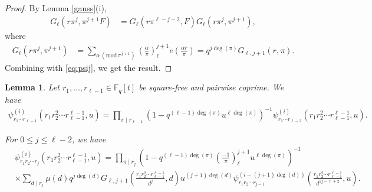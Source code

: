 \documentclass[12pt]{amsart}
\newtheorem{lemma}[theorem]{Lemma}
\newcommand{\F}{\mathbb{F}}
\renewcommand{\pmod}[1]{\,(\mathrm{mod}\,#1)}
\newcommand{\legl}[2]{\left( \frac{#1}{#2} \right)_\ell}
\begin{document}
\begin{proof}
By Lemma \ref{gauss}(i),
\begin{align*}
G_\ell(r \pi^{j}, \pi^{j+1} F)
&= G_\ell(r \pi^{\ell-j-2}, F)  G_\ell(r \pi^{j}, \pi^{j+1}),
\end{align*}
where
\begin{align*} 
G_\ell(r \pi^j, \pi^{j+1}) &= \sum_{\alpha \pmod{\pi^{j+1}}} \legl{\alpha}{\pi}^{j+1} e \left( \frac{\alpha r}{\pi} \right)  = q^{j\deg(\pi)} G_{\ell, j+1}(r, \pi).
\end{align*}
Combining with \eqref{eq:psij}, we get the result. 
\end{proof}
\begin{lemma} \label{lem:argh}
Let $r_1, \dots, r_{\ell-1} \in \F_q[t]$ be square-free and pairwise coprime.
We have 
\begin{align*}
\psi_{r_1 \cdots r_{\ell-1}}^{(i)}(r_1 r_2^2 \cdots r_{\ell-1}^{\ell-1},u)
= \prod_{\pi \mid r_{\ell-1}} \left( 1 - q^{(\ell-1)\deg(\pi) } u^{\ell\deg(\pi)} \right)^{-1} \psi^{(i)}_{r_1 \cdots r_{\ell-2}}(r_1 r_2^2 \cdots r_{\ell-1}^{\ell-1},u).
\end{align*}

For $0\leq j\leq \ell-2$, we have 
\begin{align}\label{eq:general}
&\psi^{(i)}_{r_1 r_2 \cdots r_{j}} (r_1 r_2^2 \cdots r_{\ell-1}^{\ell-1}, u) = \prod_{\pi \mid r_j}
\left(1 - q^{(\ell-1)\deg(\pi)} \legl{-1}{\pi}^{j+1}u^{\ell \deg(\pi)}\right)^{-1}\nonumber \\
&\times  \sum_{d \mid r_{j}} \mu(d) q^{j \deg(d)} G_{\ell,j+1} \left( \frac{r_1 r_2^2 \cdots r_{\ell-1}^{\ell-1}}{d^{j}} , d \right) u^{(j+1) \deg(d)}  \psi^{(i-(j+1)\deg(d))}_{r_1 r_2 \cdots r_{j-1}} \left( \frac{r_1 r_2^2 \cdots r_{\ell-1}^{\ell-1}}{d^{2j-\ell+2}}, u \right).
\end{align}

\end{lemma}
\end{document}

